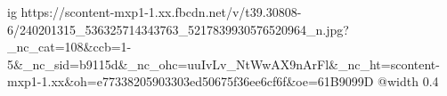  
 
 
 
 

\ifcmt
  ig https://scontent-mxp1-1.xx.fbcdn.net/v/t39.30808-6/240201315_536325714343763_5217839930576520964_n.jpg?_nc_cat=108&ccb=1-5&_nc_sid=b9115d&_nc_ohc=uuIvLv_NtWwAX9nArFl&_nc_ht=scontent-mxp1-1.xx&oh=e77338205903303ed50675f36ee6cf6f&oe=61B9099D
  @width 0.4
\fi
